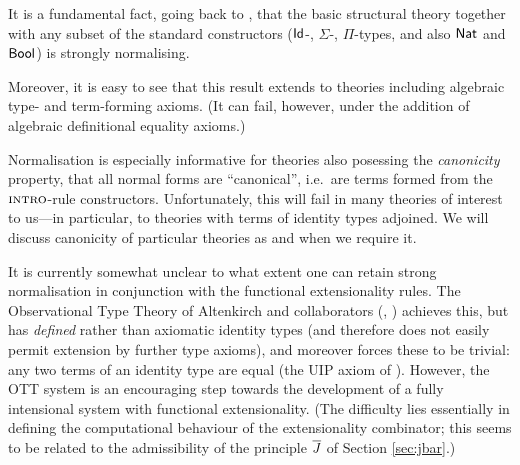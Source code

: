 \begin{para}  It is a fundamental fact, going back to \cite{martin-lof:predicative-part}, that the basic structural theory together with any subset of the standard constructors ($\mathsf{Id}$-, $\Sigma$-, $\Pi$-types, and also $\mathsf{Nat}$ and $\mathsf{Bool}$) is strongly normalising.

Moreover, it is easy to see  that this result extends to theories including algebraic type- and term-forming axioms.  (It can fail, however, under the addition of algebraic definitional equality axioms.)

Normalisation is especially informative for theories also posessing the \emph{canonicity} property, that all normal forms are ``canonical'', i.e.\ are terms formed from the $\textsc{intro}$-rule constructors.  Unfortunately, this will fail in many theories of interest to us---in particular, to theories with terms of identity types adjoined.  We will discuss canonicity of particular theories as and when we require it.

It is currently somewhat unclear to what extent one can retain strong normalisation in conjunction with the functional extensionality rules.  The Observational Type Theory of Altenkirch and collaborators (\cite{altenkirch:ott}, \cite{altenkirch-mcbride-swierstra}) achieves this, but has \emph{defined} rather than axiomatic identity types (and therefore does not easily permit extension by further type axioms), and moreover forces these to be trivial: any two terms of an identity type are equal (the UIP axiom of \cite{hofmann:extensional??}).  However, the OTT system is an encouraging step towards the development of a fully intensional system with functional extensionality.  (The difficulty lies essentially in defining the computational behaviour of the extensionality combinator; this seems to be related to the admissibility of the principle $\overline{J}$ of Section \ref{sec:jbar}.)
\end{para}









